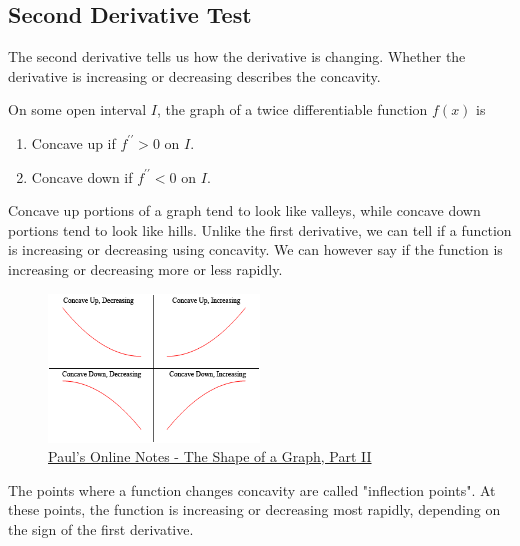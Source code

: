 \subsection{Second Derivative Test}
The second derivative tells us how the derivative is changing.
Whether the derivative is increasing or decreasing describes the concavity.
\begin{definition}
	On some open interval $I$, the graph of a twice differentiable function $f(x)$ is
	\begin{enumerate}
		\item Concave up if $f^{\prime\prime} > 0$ on $I$.
		\item Concave down if $f^{\prime\prime} < 0$ on $I$.
	\end{enumerate}
\end{definition}

\noindent
Concave up portions of a graph tend to look like valleys, while concave down portions tend to look like hills.
Unlike the first derivative, we can tell if a function is increasing or decreasing using concavity.
We can however say if the function is increasing or decreasing more or less rapidly.

\begin{figure}[H]
	\label{mvt}
	\centering
	\includegraphics[width = 0.5\textwidth]{./applications_derivative/concavity.png}
	\caption{\hyperref{https://tutorial.math.lamar.edu/classes/calci/shapeofgraphptii.aspx}{}{}{Paul's Online Notes - The Shape of a Graph, Part II}}
\end{figure}

\noindent
The points where a function changes concavity are called "inflection points".
At these points, the function is increasing or decreasing most rapidly, depending on the sign of the first derivative.

